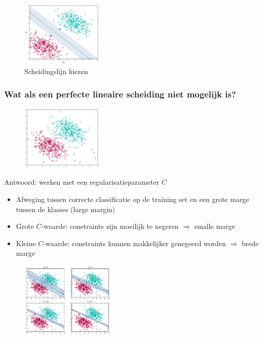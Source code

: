 \documentclass{article}
\begin{document}
\begin{figure}[H]
    \centering
    \includegraphics[width=0.35\textwidth]{svm-hoe.png}
    \caption{Scheidingslijn kiezen}
\end{figure}

\subsubsection{Wat als een perfecte lineaire scheiding niet mogelijk is?}

\begin{figure}[H]
    \centering
    \includegraphics[width=0.35\textwidth]{svm-perfect-onmogelijk.png}
    \caption{}
\end{figure}

Antwoord: werken met een regularisatieparameter $C$

\begin{itemize}
    \item Afweging tussen correcte classificatie op de training set en een grote marge tussen de klasses (large margin)
    \item Grote $C$-waarde: constraints zijn moeilijk te negeren $\Rightarrow$ smalle marge
    \item Kleine $C$-waarde: constraints kunnen makkelijker genegeerd worden $\Rightarrow$ brede marge
\end{itemize}

\begin{figure}[H]
    \centering
    \includegraphics[width=0.4\textwidth]{svm-regularisatie.png}
    \caption{}
\end{figure}
\end{document}
